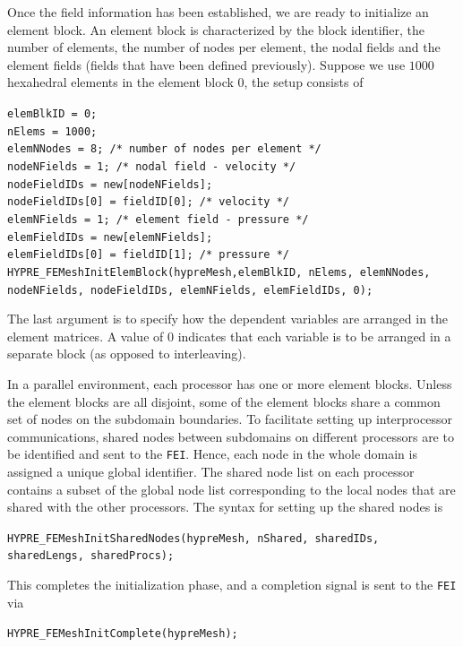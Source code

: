 Once the field information has been established, we are ready to initialize
an element block. An element block is characterized by the block identifier,
the number of elements, the number of nodes per element, the nodal fields 
and the element fields (fields that have been defined previously). Suppose 
we use $1000$ hexahedral elements in the element block $0$, the setup 
consists of
\begin{tabbing}
\hspace{0.5in} \= {\tt elemBlkID = 0;} \\
               \> {\tt nElems = 1000;} \\
               \> {\tt elemNNodes = 8; /* number of nodes per element */} \\
               \> {\tt nodeNFields = 1; /* nodal field - velocity */} \\
               \> {\tt nodeFieldIDs = new[nodeNFields];} \\
               \> {\tt nodeFieldIDs[0] = fieldID[0]; /* velocity */ } \\
               \> {\tt elemNFields = 1; /* element field - pressure */} \\
               \> {\tt elemFieldIDs = new[elemNFields];} \\
               \> {\tt elemFieldIDs[0] = fieldID[1]; /* pressure */ } \\
 \> {\tt HYPRE\_FEMeshInitElemBlock(hypreMesh,elemBlkID, nElems, elemNNodes,}\\
 \> \hspace{1.0in} {\tt nodeNFields, nodeFieldIDs, elemNFields, elemFieldIDs, 0);} 
\end{tabbing}
The last argument is to specify how the dependent variables are arranged in
the element matrices. A value of $0$ indicates that each variable is to be
arranged in a separate block (as opposed to interleaving).

In a parallel environment, each processor has one or more element blocks.
Unless the element blocks are all disjoint, some of the element blocks
share a common set of nodes on the subdomain boundaries. To facilitate
setting up interprocessor communications, shared nodes between subdomains
on different processors are to be identified and sent to the {\tt FEI}.
Hence, each node in the whole domain is assigned a unique global
identifier. The shared node list on each processor contains a subset
of the global node list
corresponding to the local nodes that are shared with the other processors.
The syntax for setting up the shared nodes is
\begin{tabbing}
\hspace{0.5in} \= {\tt HYPRE\_FEMeshInitSharedNodes(hypreMesh, nShared, sharedIDs,}\\
\> \hspace{1.0in} {\tt sharedLengs, sharedProcs);}
\end{tabbing}
This completes the initialization phase, and a completion signal is sent to
the {\tt FEI} via
\begin{tabbing}
\hspace{0.5in} \= {\tt HYPRE\_FEMeshInitComplete(hypreMesh);}
\end{tabbing}

